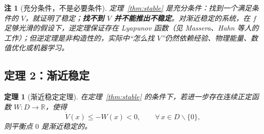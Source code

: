 \documentclass[11pt, a4paper, UTF8, fontset=none]{ctexart}
\theoremstyle{cnthm}
\newtheorem{theorem}{定理}[section]
\newtheorem{remark}{注}[section]
\newcommand{\R}{\mathbb{R}}
\begin{document}
\begin{remark}[充分条件，不是必要条件]
定理~\ref{thm:stable} 是充分条件：找到一个满足条件的 $V$，就证明了稳定；\textbf{找不到 $V$ 并不能推出不稳定}。对渐近稳定的系统，在 $f$ 足够光滑的假设下，逆定理保证存在 Lyapunov 函数（见 Massera、Hahn 等人的工作\cite{Massera1949,Hahn1967}）；但逆定理是非构造性的，实际中“怎么找 $V$”仍然依赖经验、物理能量、数值优化或机器学习。
\end{remark}

\subsection{定理 2：渐近稳定}

\begin{theorem}[渐近稳定定理]
\label{thm:asym}
在定理~\ref{thm:stable} 的条件下，若进一步存在连续正定函数 $W:D\to\R$，使得
\begin{equation}
  \dot V(x)\le -W(x)<0,\qquad \forall\,x\in D\backslash\{0\},
  \label{eq:asym-condition}
\end{equation}
则平衡点 $0$ 是渐近稳定的。
\end{theorem}
\end{document}
